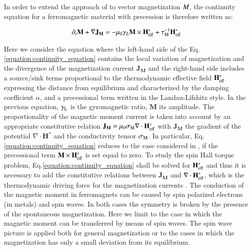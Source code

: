 \documentclass[review]{elsarticle}
\begin{document}
In order to extend the approach of \cite{johnson1987thermodynamic, basso2016nonequilibrium, basso2016thermodynamic} to vector magnetization $\boldmath{M}$, the continuity equation for a ferromagnetic material with precession is therefore written as:

\begin{equation}
\label{equation:continuity_equation}
\partial_t\mathbf{M}+ \nabla\mathbf{J}_{\mathbf{M}}=-\mu_0\gamma_L\mathbf{M}\times\mathbf{H}_{\mathrm{\tiny{eff}}}^* 
+\tau_{\mathrm{\tiny{M}}}^{-1}\mathbf{H}_{\mathrm{\tiny{eff}}}^*
\end{equation}

Here we consider the equation where the left-hand side of the Eq.\ref{equation:continuity_equation} contains the local variation of magnetization and the divergence of the  magnetization current $\mathbf{J}_{\mathbf{M}}$ and the right-hand side includes a source/sink terms proportional to the thermodynamic effective field $\mathbf{H}_{\mathrm{\tiny{eff}}}^*$ expressing the distance from equilibrium and characterized by the damping coefficient $\alpha$, and a precessional term written in the Landau-Lifshitz style. In the previous equation, $\gamma_{\mathrm{\tiny{L}}}$ is the gyromagnetic ratio, $\mathbf{M}$ its amplitude. The proportionality of the magnetic moment current 
is taken into account by an appropriate constitutive relation  $\mathbf{J}_{\mathbf{M}}=\mu_0\sigma_{\mathrm{\tiny{M}}}\nabla\cdot\mathbf{H}_{\mathrm{\tiny{eff}}}^*$ with $\mathbf{J}_{\mathbf{M}}$  the gradient of the potential $\nabla\cdot\mathbf{H}^*$ and the conductivity tensor $\sigma_{\mathrm{\tiny{M}}}$. In particular, Eq.\ref{equation:continuity_equation} reduces to the case considered in \cite{basso2016nonequilibrium}, \cite{basso2016thermodynamic} if the precessional term  $\mathbf{M} \times\mathbf{H}^*_{\mathrm{\tiny{eff}}}$ is set equal to zero. To study the spin Hall torque problem, Eq.\ref{equation:continuity_equation} shall be solved for $\mathbf{H}^*_{\mathrm{\tiny{eff}}}$ and thus it is necessary to add the constitutive relations between $\mathbf{J}_{\mathbf{M}} $ and $\nabla\cdot\mathbf{H}^*_{\mathrm{\tiny{eff}}}$, which is the thermodynamic driving force for the magnetization currents \cite{basso2016nonequilibrium, basso2016thermodynamic}. The conduction of the magnetic moment in ferromagnets can be caused by spin polarized electrons (in metals) and spin waves. In both cases the symmetry is broken by the presence of the spontaneous magnetization. Here we limit to the case in which the magnetic moment can be transferred by means of spin waves. The spin wave picture is applied both for  general magnetization or to the cases in which the magnetization has only a small deviation from its equilibrium.
\end{document}

